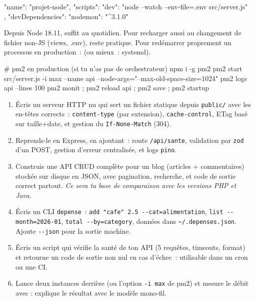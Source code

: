 \begin{codejson}
{
  "name": "projet-node",
  "scripts": { "dev": "node --watch --env-file=.env src/server.js" },
  "devDependencies": { "nodemon": "^3.1.0" }
}
\end{codejson}

Depuis Node 18.11,  suffit au quotidien. Pour recharger aussi au changement de
fichier non-JS (views, .env),  reste pratique. Pour red\'emarrer
proprement un processus en production~:  (ou mieux~: systemd).

\begin{terminal}
# pm2 en production (si tu n'as pas de orchestrateur)
npm i -g pm2
pm2 start src/server.js -i max --name api --node-args="--max-old-space-size=1024"
pm2 logs api --lines 100
pm2 monit ; pm2 reload api ; pm2 save ; pm2 startup
\end{terminal}

\begin{exercice}
\begin{enumerate}
  \item \'Ecris un serveur HTTP nu qui sert un fichier statique depuis \verb|public/| avec les
        en-t\^etes corrects~: \verb|content-type| (par extension), \verb|cache-control|, ETag
        bas\'e sur taille+date, et gestion du \verb|If-None-Match| (304).
  \item Reprends-le en Express, en ajoutant~: route \verb|/api/sante|, validation par
        \verb|zod| d'un POST, gestion d'erreur centralis\'ee, et logs \verb|pino|.
  \item Construis une API CRUD compl\`ete pour un blog (articles + commentaires) stock\'ee sur
        disque en JSON, avec pagination, recherche, et code de sortie correct partout.
        \emph{Ce sera ta base de comparaison avec les versions PHP et Java.}
  \item \'Ecris un CLI \verb|depense|~: \verb|add "cafe" 2.5 --cat=alimentation|,
        \verb|list --month=2026-01|, \verb|total --by=category|, donn\'ees dans
        \verb|~/.depenses.json|. Ajoute \verb|--json| pour la sortie machine.
  \item \'Ecris un script qui v\'erifie la sant\'e de ton API (5 requ\^etes, timeouts, format) et
        retourne un code de sortie non nul en cas d'\'echec~: utilisable dans un cron ou une CI.
  \item Lance deux instances derri\`ere  (ou l'option \verb|-i max| de pm2)
        et mesure le d\'ebit avec  :
        explique le r\'esultat avec le mod\`ele mono-fil.
\end{enumerate}
\end{exercice}

